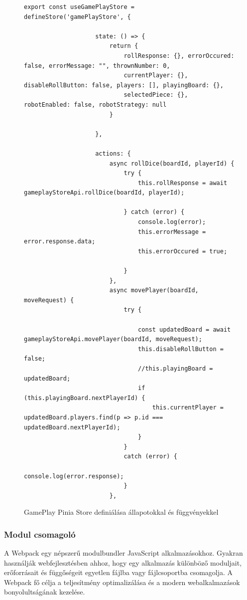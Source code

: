 \documentclass[a4paper,twoside]{article}
\begin{document}
\begin{figure}
	\caption{GamePlay Pinia Store definiálása állapotokkal és függvényekkel}
	
		\begin{minipage}{\textwidth}
			\begin{lstlisting}[style=javascriptStyle]
				export const useGamePlayStore = defineStore('gamePlayStore', {
					
					state: () => {
						return {
							rollResponse: {}, errorOccured: false, errorMessage: "", thrownNumber: 0,
							currentPlayer: {}, disableRollButton: false, players: [], playingBoard: {},
							selectedPiece: {}, robotEnabled: false, robotStrategy: null
						}
						
					},
					
					actions: {
						async rollDice(boardId, playerId) {
							try {
								this.rollResponse = await gameplayStoreApi.rollDice(boardId, playerId);
								
							} catch (error) {
								console.log(error);
								this.errorMessage = error.response.data;
								this.errorOccured = true;
								
							}
						},
						async movePlayer(boardId, moveRequest) {
							try {
								
								const updatedBoard = await gameplayStoreApi.movePlayer(boardId, moveRequest);
								this.disableRollButton = false;
								//this.playingBoard = updatedBoard;
								if (this.playingBoard.nextPlayerId) {
									this.currentPlayer = updatedBoard.players.find(p => p.id === updatedBoard.nextPlayerId);
								}
							}
							catch (error) {
								console.log(error.response);
							}
						},
			\end{lstlisting}
		\end{minipage}
	
	\label{pinia}
\end{figure}
\subsubsection{Modul csomagoló}\label{webpack-tech}

A Webpack\cite{webpack} egy népszerű modulbundler JavaScript alkalmazásokhoz. Gyakran
használják webfejlesztésben ahhoz, hogy egy alkalmazás különböző moduljait,
erőforrásait és függőségeit egyetlen fájlba vagy fájlcsoportba csomagolja. A Webpack fő
célja a teljesítmény optimalizálása és a modern webalkalmazások bonyolultságának
kezelése.
\end{document}
